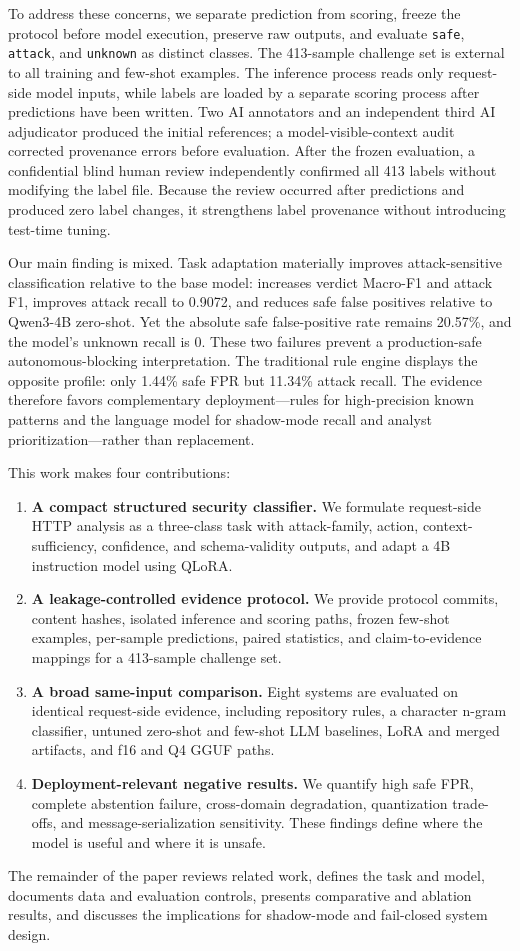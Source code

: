 To address these concerns, we separate prediction from scoring, freeze the protocol before model execution, preserve raw outputs, and evaluate \texttt{safe}, \texttt{attack}, and \texttt{unknown} as distinct classes. The 413-sample \challenge{} challenge set is external to all training and few-shot examples. The inference process reads only request-side model inputs, while labels are loaded by a separate scoring process after predictions have been written. Two AI annotators and an independent third AI adjudicator produced the initial references; a model-visible-context audit corrected provenance errors before evaluation. After the frozen evaluation, a confidential blind human review independently confirmed all 413 labels without modifying the label file. Because the review occurred after predictions and produced zero label changes, it strengthens label provenance without introducing test-time tuning.

Our main finding is mixed. Task adaptation materially improves attack-sensitive classification relative to the base model: \model{} increases verdict Macro-F1 and attack F1, improves attack recall to 0.9072, and reduces safe false positives relative to Qwen3-4B zero-shot. Yet the absolute safe false-positive rate remains 20.57\%, and the model's unknown recall is 0. These two failures prevent a production-safe autonomous-blocking interpretation. The traditional rule engine displays the opposite profile: only 1.44\% safe FPR but 11.34\% attack recall. The evidence therefore favors complementary deployment---rules for high-precision known patterns and the language model for shadow-mode recall and analyst prioritization---rather than replacement.

This work makes four contributions:
\begin{enumerate}
    \item \textbf{A compact structured security classifier.} We formulate request-side HTTP analysis as a three-class task with attack-family, action, context-sufficiency, confidence, and schema-validity outputs, and adapt a 4B instruction model using QLoRA.
    \item \textbf{A leakage-controlled evidence protocol.} We provide protocol commits, content hashes, isolated inference and scoring paths, frozen few-shot examples, per-sample predictions, paired statistics, and claim-to-evidence mappings for a 413-sample challenge set.
    \item \textbf{A broad same-input comparison.} Eight systems are evaluated on identical request-side evidence, including repository rules, a character n-gram classifier, untuned zero-shot and few-shot LLM baselines, LoRA and merged artifacts, and f16 and Q4 GGUF paths.
    \item \textbf{Deployment-relevant negative results.} We quantify high safe FPR, complete abstention failure, cross-domain degradation, quantization trade-offs, and message-serialization sensitivity. These findings define where the model is useful and where it is unsafe.
\end{enumerate}

The remainder of the paper reviews related work, defines the task and model, documents data and evaluation controls, presents comparative and ablation results, and discusses the implications for shadow-mode and fail-closed system design.
